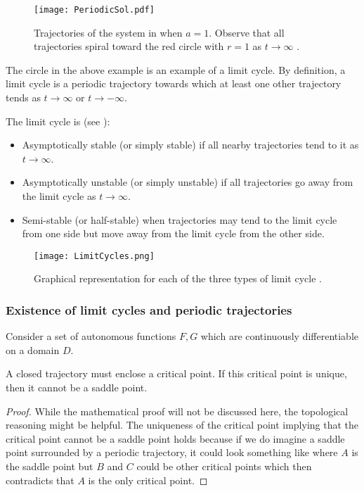 \begin{figure}[!ht]
	\centering
	\texttt{[image: PeriodicSol.pdf]}
	\caption{Trajectories of the system in  when $a=1$. Observe that all trajectories spiral toward the red circle with $r=1$ as $t \to \infty$ \cite[Figure 9.7.1]{boyce}.}
	\label{fig:periodicsol}
\end{figure}

The circle in the above example is an example of a limit cycle. By definition, a limit cycle is a periodic trajectory towards which at least one other trajectory tends as $t \to \infty$ or $t \to -\infty$.

The limit cycle is (see ): 
\begin{itemize}
	\item Asymptotically stable (or simply stable) if all nearby trajectories tend to it as $t \to \infty$.
	\item Asymptotically unstable (or simply unstable) if all trajectories go away from the limit cycle as $t \to \infty$.
	\item Semi-stable (or half-stable) when trajectories may tend to the limit cycle from one side but move away from the limit cycle from the other side.
\end{itemize}

\begin{figure}[!ht]
	\centering
	\texttt{[image: LimitCycles.png]}
	\caption{Graphical representation for each of the three types of limit cycle \cite{limitcycles}.}
	\label{fig:limitcycles}
\end{figure}

\subsubsection*{Existence of limit cycles and periodic trajectories}

Consider a set of autonomous functions $F,G$ which are continuously differentiable on a domain $D$.

\begin{theorem}\label{thrm:periodictraj1}
	A closed trajectory must enclose a critical point. If this critical point is unique, then it cannot be a saddle point.
\end{theorem}

\begin{proof}
	While the mathematical proof will not be discussed here, the topological reasoning might be helpful. 
	The uniqueness of the critical point implying that the critical point cannot be a saddle point holds because if we do imagine a saddle point surrounded by a periodic trajectory, it could look something like  where $A$ is the saddle point but $B$ and $C$ could be other critical points which then contradicts that $A$ is the only critical point.
\end{proof}


